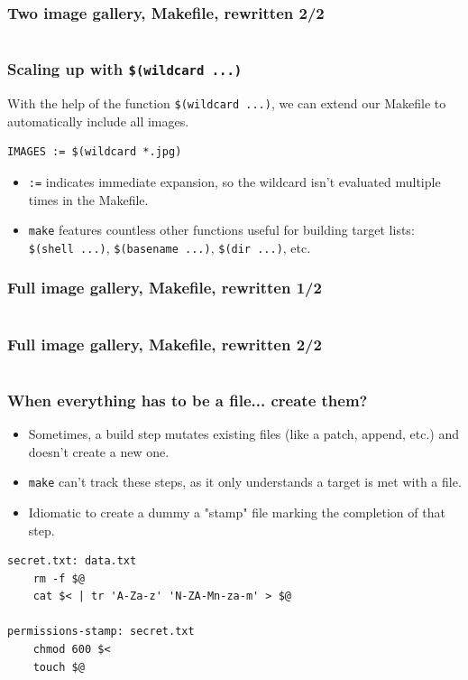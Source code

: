 \documentclass[xcolor=dvipsnames,t,compress]{beamer}
\begin{document}
\begin{frame}[fragile]
\frametitle{Two image gallery, Makefile, rewritten 2/2}
\vspace{-1em}
\inputminted[fontsize=\small,frame=single,tabsize=4,firstline=13,lastline=24]{make}{examples/make/Makefile.11}
\end{frame}

\begin{frame}[fragile]
\frametitle{Scaling up with \texttt{\$(wildcard ...)}}
\vspace{-1em}
With the help of the function \texttt{\$(wildcard ...)}, we can extend our Makefile to automatically include all images.

\begin{verbatim}
IMAGES := $(wildcard *.jpg)
\end{verbatim}
\begin{itemize}
\item \texttt{:=} indicates immediate expansion, so the wildcard isn't evaluated multiple times in the Makefile.
\item \texttt{make} features countless other functions useful for building target lists: \texttt{\$(shell ...)}, \texttt{\$(basename ...)}, \texttt{\$(dir ...)}, etc.
\end{itemize}
\end{frame}

\begin{frame}[fragile]
\frametitle{Full image gallery, Makefile, rewritten 1/2}
\vspace{-1em}
\inputminted[fontsize=\small,frame=single,tabsize=4,firstline=1,lastline=15]{make}{examples/final/Makefile}
\end{frame}

\begin{frame}[fragile]
\frametitle{Full image gallery, Makefile, rewritten 2/2}
\vspace{-1em}
\inputminted[fontsize=\small,frame=single,tabsize=4,firstline=16,lastline=27]{make}{examples/final/Makefile}
\end{frame}

\begin{frame}[fragile]
\frametitle{When everything has to be a file... create them?}
\vspace{-1em}
\begin{itemize}[<+->]
\item Sometimes, a build step mutates existing files (like a patch, append, etc.) and doesn't create a new one.
\item \texttt{make} can't track these steps, as it only understands a target is met with a file.
\item Idiomatic to create a dummy a "stamp" file marking the completion of that step.
\end{itemize}
\pause
\begin{verbatim}
secret.txt: data.txt
    rm -f $@
    cat $< | tr 'A-Za-z' 'N-ZA-Mn-za-m' > $@

permissions-stamp: secret.txt
    chmod 600 $<
    touch $@
\end{verbatim}
\end{frame}
\end{document}
